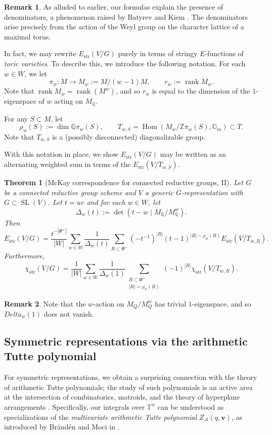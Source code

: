 \documentclass[12pt,a4paper]{amsart}
\newtheorem{theorem}{Theorem}
\theoremstyle{definition}
\newtheorem{remark}[remark]{Remark}
\newcommand{\TT}{\mathbb T}
\newcommand{\ZZ}{\mathbb{Z}}
\newcommand{\QQ}{\mathbb{Q}}
\newcommand{\cA}{\mathcal{A}}
\newcommand{\bG}{\mathbb{G}}
\newcommand{\str}{\mathrm{str}}
\renewcommand{\1}{\textbf{1}}
\newcommand{\<}{\langle}
\renewcommand{\>}{\rangle}
\DeclareMathOperator{\Hom}{Hom}
\DeclareMathOperator{\rank}{rank}
\DeclareMathOperator{\SL}{SL}
\begin{document}
\begin{remark}
As alluded to earlier, our formulas explain the presence of denominators, a phenomenon raised by Batyrev \cite[Question 5.5]{Batyrev1998} and Kiem \cite{Kiem2003}. The denominators arise precisely from the action of the Weyl group on the character lattice of a maximal torus.
\end{remark}




In fact, we may rewrite $E_{\str}(V/G)$ purely in terms of stringy $E$-functions of \emph{toric varieties}. To describe this, we introduce the following notation. For each $w\in W$, we let
\[
	\pi_w\colon M\to M_w:=M/(w-1)M,\qquad 	r_w:=\rank M_w.
\]
Note that $\rank M_w=\rank(M^w)$, and so $r_w$ is equal to the dimension of the $1$-eigenspace of $w$ acting on $M_\QQ$.

For any $S\subset M$, let
\[
	\rho_w(S):=\dim\QQ\pi_w(S),\qquad T_{w,S}=\Hom(M_w/\ZZ\pi_w(S),\bG_m)\subset T.
\]
Note that $T_{w,S}$ is a (possibly disconnected) diagonalizable group.

With this notation in place, we show $E_{\str}(V/G)$ may be written as an alternating weighted sum in terms of the $E_{\str}(V/T_{w,S})$.


\begin{theorem}[{McKay correspondence for connected reductive groups, II}]\label{thm:main-McKay-connected-reductive-2}
Let $G$ be a connected reductive group scheme and $V$ a generic $G$-representation with $G\subset\SL(V)$. Let $t=uv$ and for each $w\in W$, let
\[
	\Delta_w(t):=\det(t-w\mid M_\QQ/M_\QQ^w).
\]
Then
\[
	E_{\str}(V/G)=\frac{t^{-|\Phi^+|}}{|W|}\sum_{w\in W}\frac{1}{\Delta_w(t)}\sum_{R\subset\Phi^+} (-t^{-1})^{|R|}(t-1)^{|R|-\rho_w(R)} E_{\str}(V/T_{w,R}).
\]
Furthermore,
\[
	\chi_{\str}(V/G)=\frac{1}{|W|}\sum_{w\in W}\frac{1}{\Delta_w(1)}\sum_{\substack{R\subset\Phi^+\\|R|=\rho_w(R)}} (-1)^{|R|}\chi_{\str}(V/T_{w,R}).
\]
\end{theorem}

\begin{remark}
Note that the $w$-action on $M_Q / M^w_Q$ has trivial $1$-eigenspace, and so $Delta_w(1)$ does not vanish.
\end{remark}






\subsection{Symmetric representations via the arithmetic Tutte polynomial}
For symmetric representations, we obtain a surprising connection with the theory of arithmetic Tutte polynomials; the study of such polynomials is an active area at the intersection of combinatorics, matroids, and the theory of hyperplane arrangements \cite{Ardila07,ACH15,BrandenMoci2014,DupontFinkMoci,MaJinYang24}. Specifically, our integrals over $\TT^w$ can be understood as specializations of the \emph{multivariate arithmetic Tutte polynomial} $Z_\cA(q,\textbf{v})$, as introduced by Br\"and\'en and Moci in \cite{BrandenMoci2014}.
\end{document}
